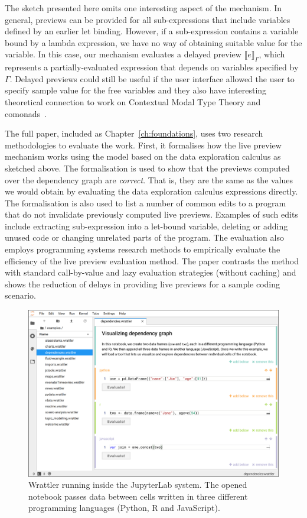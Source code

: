 \documentclass[fleqn,11pt]{report}
\theoremstyle{definition}
\begin{document}
The sketch presented here omits one interesting aspect of the mechanism. In general, previews
can be provided for all sub-expressions that include variables defined by an earlier let binding.
However, if a sub-expression contains a variable bound by a lambda expression, we have no
way of obtaining suitable value for the variable. In this case, our mechanism evaluates
a delayed preview $\llbracket e \rrbracket_\Gamma$, which represents a partially-evaluated
expression that depends on variables specified by $\Gamma$. Delayed previews could still be
useful if the user interface allowed the user to specify sample value for the free variables
and they also have interesting theoretical connection to work on Contextual Modal Type Theory
\citep{nanevski-2008-cmtt} and comonads~\citep{gabbay-2013-cmtt}.

The full paper, included as Chapter~\ref{ch:foundations}, uses two research methodologies
to evaluate the work. First, it formalises how the live preview mechanism works using the
model based on the data exploration calculus as sketched above. The formalisation is
used to show that the previews computed over the dependency graph are \emph{correct}. That is,
they are the same as the values we would obtain by evaluating the data exploration calculus
expressions directly. The formalisation is also used to list a number of common edits to
a program that do not invalidate previously computed live previews. Examples of such edits
include extracting sub-expression into a let-bound variable, deleting or adding unused code
or changing unrelated parts of the program. The evaluation also employs programming systems
research methods to empirically evaluate the efficiency of the live preview evaluation method.
The paper contrasts the method with standard call-by-value and lazy evaluation strategies
(without caching) and shows the reduction of delays in providing live previews for a sample
coding scenario.

\begin{figure}[t]
\vspace{0.5em}
\includegraphics[scale=0.25]{img/wrattler.png}
\caption{Wrattler running inside the JupyterLab system. The opened notebook passes data between
cells written in three different programming languages (Python, R and JavaScript).}
\label{fig:wrattler}
\vspace{0.5em}
\end{figure}
\end{document}
